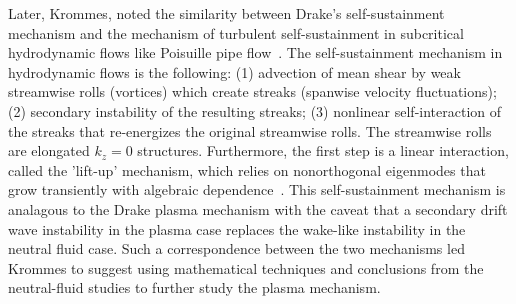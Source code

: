 Later, Krommes, noted the similarity between Drake's self-sustainment mechanism and the mechanism of turbulent self-sustainment in subcritical hydrodynamic flows like Poisuille pipe 
flow~\cite{krommes1999}. The self-sustainment mechanism in hydrodynamic flows is the following: (1) advection of mean shear by weak streamwise rolls (vortices) which create streaks (spanwise
velocity fluctuations); (2) secondary instability of the resulting streaks; (3) nonlinear self-interaction of the streaks that re-energizes the original streamwise rolls. The streamwise rolls
are elongated $k_z = 0$ structures. Furthermore, the first step is a linear interaction, called the 'lift-up' mechanism, which relies on nonorthogonal eigenmodes that grow transiently with
algebraic dependence~\cite{trefethen1993,waleffe1995,henningson1996}. This self-sustainment mechanism is analagous to the Drake plasma mechanism with the caveat that a secondary drift wave
instability in the plasma case replaces the wake-like instability in the neutral fluid case. Such a correspondence between the two mechanisms led Krommes to suggest using mathematical techniques
and conclusions from the neutral-fluid studies to further study the plasma mechanism. 
